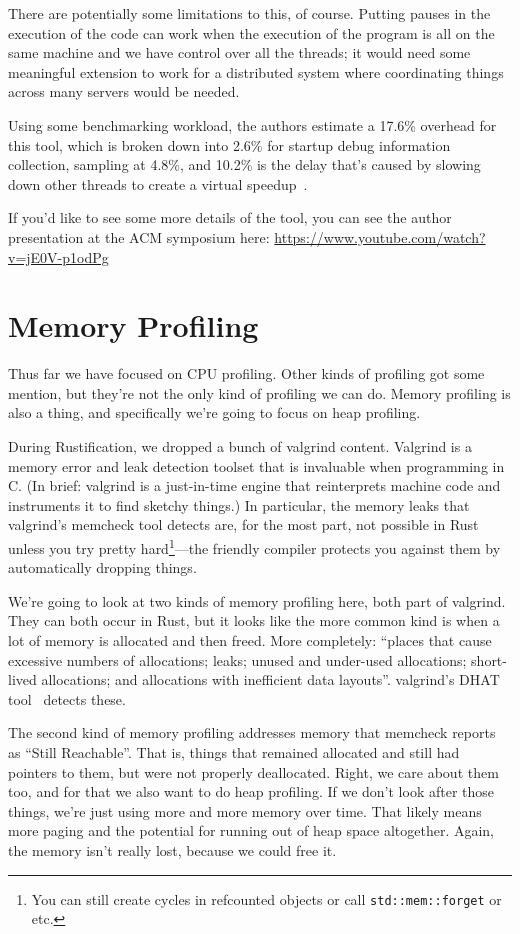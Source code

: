 \documentclass[a4paper]{report}
\newcommand{\CPP}{C\nolinebreak\hspace{-.05em}\raisebox{.4ex}{\tiny\bf +}\nolinebreak\hspace{-.10em}\raisebox{.4ex}{\tiny\bf +}}
\def\CPP{{C\nolinebreak[4]\hspace{-.05em}\raisebox{.4ex}{\tiny\bf ++}}}
\begin{document}
There are potentially some limitations to this, of course. Putting pauses in the execution of the code can work when the execution of the program is all on the same machine and we have control over all the threads; it would need some meaningful extension to work for a distributed system where coordinating things across many servers would be needed.

Using some benchmarking workload, the authors estimate a 17.6\% overhead for this tool, which is broken down into 2.6\% for startup debug information collection, sampling at 4.8\%, and 10.2\% is the delay that's caused by slowing down other threads to create a virtual speedup~\cite{coz}.

If you'd like to see some more details of the tool, you can see the author presentation at the ACM symposium here: \url{https://www.youtube.com/watch?v=jE0V-p1odPg}

\section*{Memory Profiling}

Thus far we have focused on CPU profiling. Other kinds of profiling got some mention, but they're not the only kind of profiling we can do. Memory profiling is also a thing, and specifically we're going to focus on heap profiling.

During Rustification, we dropped a bunch of valgrind content. Valgrind is a memory error and leak detection toolset that is invaluable when programming in \CPP. (In brief: valgrind is a just-in-time engine that reinterprets machine code and instruments it to find sketchy things.) In particular, the memory leaks that valgrind's memcheck tool detects are, for the most part, not possible in Rust unless you try pretty hard\footnote{You can still create cycles in refcounted objects or call \texttt{std::mem::forget} or etc.}---the friendly compiler protects you against them by automatically dropping things.

We're going to look at two kinds of memory profiling here, both part of valgrind. They can both occur in Rust, but it looks like the more common kind is when a lot of memory is allocated and then freed. More completely: ``places that cause excessive numbers of allocations; leaks; unused and under-used allocations; short-lived allocations; and allocations with inefficient data layouts''. valgrind's DHAT tool~\cite[Chapter~10]{valgrind} detects these.

The second kind of memory profiling addresses memory that memcheck reports as ``Still Reachable''. That is, things that remained allocated and still had pointers to them, but were not properly deallocated. Right, we care about them too, and for that we also want to do heap profiling. If we don't look after those things, we're just using more and more memory over time. That likely means more paging and the potential for running out of heap space altogether. Again, the memory isn't really lost, because we could free it.
\end{document}
